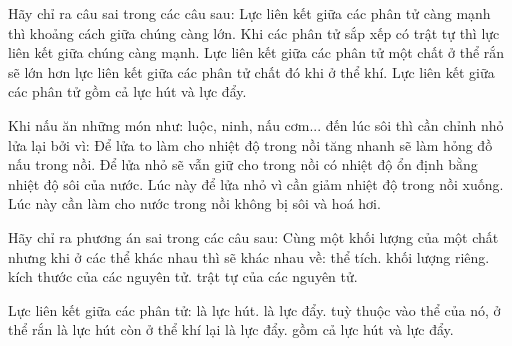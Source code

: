 \begin{ex}
Hãy chỉ ra câu sai trong các câu sau:
\choice
{\True Lực liên kết giữa các phân tử càng mạnh thì khoảng cách giữa chúng càng lớn.}
{Khi các phân tử sắp xếp có trật tự thì lực liên kết giữa chúng càng mạnh.}
{Lực liên kết giữa các phân tử một chất ở thể rắn sẽ lớn hơn lực liên kết giữa các phân tử chất đó khi ở thể khí.}
{Lực liên kết giữa các phân tử gồm cả lực hút và lực đẩy.}
\end{ex}

\begin{ex}
Khi nấu ăn những món như: luộc, ninh, nấu cơm... đến lúc sôi thì cần chỉnh nhỏ lửa lại bởi vì:
\choice
{Để lửa to làm cho nhiệt độ trong nồi tăng nhanh sẽ làm hỏng đồ nấu trong nồi.}
{\True Để lửa nhỏ sẽ vẫn giữ cho trong nồi có nhiệt độ ổn định bằng nhiệt độ sôi của nước.}
{Lúc này để lửa nhỏ vì cần giảm nhiệt độ trong nồi xuống.}
{Lúc này cần làm cho nước trong nồi không bị sôi và hoá hơi.}
\end{ex}

\begin{ex}
Hãy chỉ ra phương án sai trong các câu sau: Cùng một khối lượng của một chất nhưng khi ở các thể khác nhau thì sẽ khác nhau về:
\choice
{thể tích.}
{khối lượng riêng.}
{\True kích thước của các nguyên tử.}
{trật tự của các nguyên tử.}
\end{ex}

\begin{ex}
Lực liên kết giữa các phân tử:
\choice
{là lực hút.}
{là lực đẩy.}
{tuỳ thuộc vào thể của nó, ở thể rắn là lực hút còn ở thể khí lại là lực đẩy.}
{\True gồm cả lực hút và lực đẩy.}
\end{ex}

